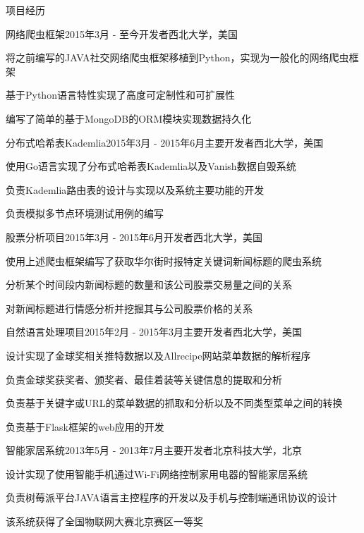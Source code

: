 \documentclass{resume} %
\begin{document}
\begin{rSection}{项目经历}

\begin{rSubsection}{网络爬虫框架}{2015年3月 - 至今}{开发者}{西北大学，美国}
\item 将之前编写的JAVA社交网络爬虫框架移植到Python，实现为一般化的网络爬虫框架
\item 基于Python语言特性实现了高度可定制性和可扩展性
\item 编写了简单的基于MongoDB的ORM模块实现数据持久化
\end{rSubsection}

\begin{rSubsection}{分布式哈希表Kademlia}{2015年3月 - 2015年6月}{主要开发者}{西北大学，美国}
\item 使用Go语言实现了分布式哈希表Kademlia以及Vanish数据自毁系统
\item 负责Kademlia路由表的设计与实现以及系统主要功能的开发
\item 负责模拟多节点环境测试用例的编写
\end{rSubsection}

\begin{rSubsection}{股票分析项目}{2015年3月 - 2015年6月}{开发者}{西北大学，美国}
\item 使用上述爬虫框架编写了获取华尔街时报特定关键词新闻标题的爬虫系统
\item 分析某个时间段内新闻标题的数量和该公司股票交易量之间的关系
\item 对新闻标题进行情感分析并挖掘其与公司股票价格的关系
\end{rSubsection}

\begin{rSubsection}{自然语言处理项目}{2015年2月 - 2015年3月}{主要开发者}{西北大学，美国}
\item 设计实现了金球奖相关推特数据以及Allrecipe网站菜单数据的解析程序
\item 负责金球奖获奖者、颁奖者、最佳着装等关键信息的提取和分析
\item 负责基于关键字或URL的菜单数据的抓取和分析以及不同类型菜单之间的转换
\item 负责基于Flask框架的web应用的开发
\end{rSubsection}

\begin{rSubsection}{智能家居系统}{2013年5月 - 2013年7月}{主要开发者}{北京科技大学，北京}
\item 设计实现了使用智能手机通过Wi-Fi网络控制家用电器的智能家居系统
\item 负责树莓派平台JAVA语言主控程序的开发以及手机与控制端通讯协议的设计
\item 该系统获得了全国物联网大赛北京赛区一等奖
\end{rSubsection}

\end{rSection}
\end{document}
